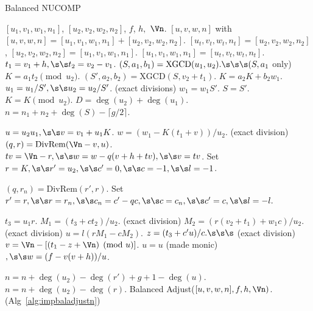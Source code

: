 \begin{algorithm}[htbp]
\caption{Balanced NUCOMP}
\label{alg:balNucomp}
\begin{algorithmic}[1]
\Require $[u_1,v_1,w_1,n_1]$, $[u_2,v_2,w_2,n_2]$, $f$, $h,$ $\Vn$.
\Ensure $[u,v,w,n]$ with $[u,v,w,n] = [u_1,v_1,w_1,n_1] + [u_2,v_2,w_2,n_2]$.
\vspace{5pt}
    \State $[u_t,v_t,w_t,n_t] = [u_2,v_2,w_2,n_2]$, $[u_2,v_2,w_2,n_2] = [u_1,v_1,w_1,n_1]$.
    \State $[u_1,v_1,w_1,n_1] = [u_t,v_t,w_t,n_t]$.
\EndIf
\State $t_1 = v_1 + h, \s\s t_2 = v_2 - v_1$.
\State $(S,a_1,b_1) = \mathrm{XGCD}(u_1,u_2). \s\s\s  (S, a_1$ only)
\State $K = a_1t_2 \pmod{u_2}$.
    \State $(S',a_2,b_2) = \mathrm{XGCD}(S,v_2 + t_1)$.
    \State $K = a_2K + b_2w_1$.
        \State $u_1 = u_1/S', \s\s u_2 = u_2/S'$. \s\s\s (exact divisions) 
        \State $w_1 = w_1S'$.
        \State $S = S'$.
    \EndIf
    \State $K = K \pmod{u_2}$.
\EndIf
\State $D = \deg(u_2) + \deg(u_1)$.
\State $n = n_1 + n_2 + \deg(S) - \lceil g/2 \rceil$.

    \State $u = u_2u_1, \s\s v = v_1 + u_1K$.
    \State $w = (w_1 - K(t_1 + v))/u_2$. \s\s\s (exact division)
        \State $(q,r) = \mathrm{DivRem}(\Vn -v,u)$.
        \State $tv = \Vn -r, \s\s w = w - q(v + h + tv), \s\s v = tv$.
    \EndIf    
\Else
    \State Set $r = K, \s\s r' = u_2, \s\s c' = 0, \s\s c = -1, \s\s l = -1$.
    
        \State $(q,r_n) = \mathrm{DivRem}(r',r)$.
        \State Set $r' = r, \s\s r = r_n, \s\s c_n = c' - qc, \s\s c = c_n, \s\s c' = c, \s\s l = -l.$
    \EndWhile

    \State $t_3 = u_1r$.
    \State $M_1 = (t_3 + ct_2)/u_2$. \s\s\s (exact division)
    \State $M_2 = (r(v_2 + t_1) + w_1c)/u_2.$ \s\s\s (exact division)
    \State $u = l(rM_1 - cM_2).$
    \State $z = (t_3 + c'u)/c. \s\s\s$ (exact division)
    \State $v = \Vn - [(t_1 - z + \Vn) \pmod{u}]$.
    \State $u = u$ (made monic)$, \s\s w = (f - v(v + h))/u$.

        \State $n = n + \deg(u_2) - \deg(r') + g + 1 - \deg(u)$.
    \Else
        \State $n = n + \deg(u_2) - \deg(r)$.
    \EndIf
\EndIf
\State \Return Balanced Adjust($[u,v,w,n], f,h,\Vn)$. (Alg~\ref{alg:impbaladjustn})
\end{algorithmic}
\end{algorithm}

